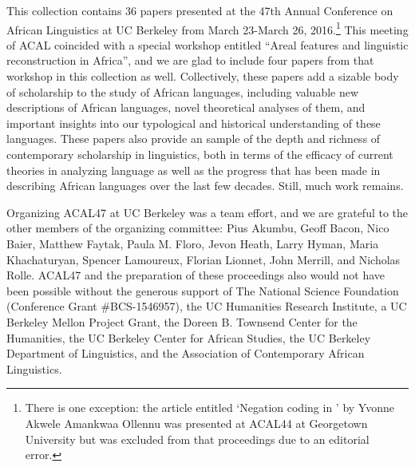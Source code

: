 \begin{refsection}
 

This collection contains 36 papers presented at the 47th Annual Conference on African Linguistics at UC Berkeley from March 23-March 26, 2016.\footnote{There is one exception: the article entitled `Negation coding in ' by Yvonne Akwele Amankwaa Ollennu was presented at ACAL44 at Georgetown University but was excluded from that proceedings due to an editorial error.} This meeting of ACAL coincided with a special workshop entitled ``Areal features and linguistic reconstruction in Africa'', and we are glad to include four papers from that workshop in this collection as well. Collectively, these papers add a sizable body of scholarship to the study of African languages, including valuable new descriptions of African languages, novel theoretical analyses of them, and important insights into our typological and historical understanding of these languages. These papers also provide an sample of the depth and richness of contemporary scholarship in linguistics, both in terms of the efficacy of current theories in analyzing language as well as the progress that has been made in describing African languages over the last few decades. Still, much work remains.

Organizing ACAL47 at UC Berkeley was a team effort, and we are grateful to the other members of the organizing committee: Pius Akumbu, Geoff Bacon, Nico Baier, Matthew Faytak, Paula M. Floro, Jevon Heath, Larry Hyman, Maria Khachaturyan, Spencer Lamoureux, Florian Lionnet, John Merrill, and Nicholas Rolle. ACAL47 and the preparation of these proceedings also would not have been possible without the generous support of The National Science Foundation (Conference Grant \#BCS-1546957), the UC Humanities Research Institute, a UC Berkeley Mellon Project Grant, the Doreen B. Townsend Center for the Humanities, the UC Berkeley Center for African Studies, the UC Berkeley Department of Linguistics, and the Association of Contemporary African Linguistics.


\end{refsection}
